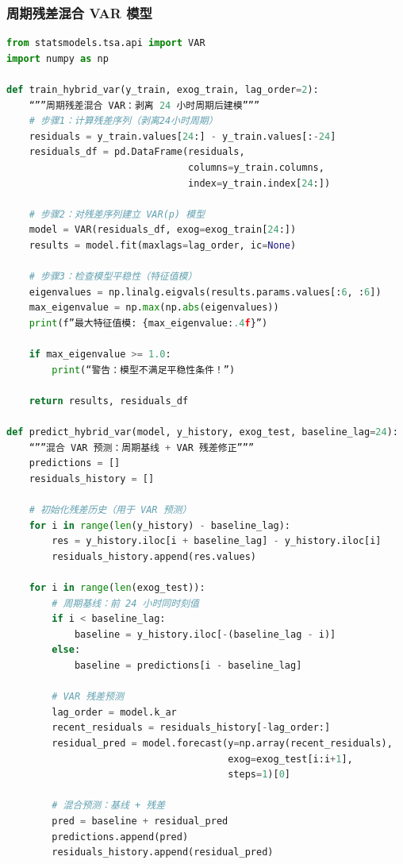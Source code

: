 \documentclass[UTF8,a4paper,12pt]{ctexart}
\begin{document}
\subsubsection{周期残差混合 VAR 模型}

\begin{lstlisting}[language=Python]
from statsmodels.tsa.api import VAR
import numpy as np

def train_hybrid_var(y_train, exog_train, lag_order=2):
    “””周期残差混合 VAR：剥离 24 小时周期后建模”””
    # 步骤1：计算残差序列（剥离24小时周期）
    residuals = y_train.values[24:] - y_train.values[:-24]
    residuals_df = pd.DataFrame(residuals,
                                columns=y_train.columns,
                                index=y_train.index[24:])

    # 步骤2：对残差序列建立 VAR(p) 模型
    model = VAR(residuals_df, exog=exog_train[24:])
    results = model.fit(maxlags=lag_order, ic=None)

    # 步骤3：检查模型平稳性（特征值模）
    eigenvalues = np.linalg.eigvals(results.params.values[:6, :6])
    max_eigenvalue = np.max(np.abs(eigenvalues))
    print(f”最大特征值模: {max_eigenvalue:.4f}”)

    if max_eigenvalue >= 1.0:
        print(“警告：模型不满足平稳性条件！”)

    return results, residuals_df

def predict_hybrid_var(model, y_history, exog_test, baseline_lag=24):
    “””混合 VAR 预测：周期基线 + VAR 残差修正”””
    predictions = []
    residuals_history = []

    # 初始化残差历史（用于 VAR 预测）
    for i in range(len(y_history) - baseline_lag):
        res = y_history.iloc[i + baseline_lag] - y_history.iloc[i]
        residuals_history.append(res.values)

    for i in range(len(exog_test)):
        # 周期基线：前 24 小时同时刻值
        if i < baseline_lag:
            baseline = y_history.iloc[-(baseline_lag - i)]
        else:
            baseline = predictions[i - baseline_lag]

        # VAR 残差预测
        lag_order = model.k_ar
        recent_residuals = residuals_history[-lag_order:]
        residual_pred = model.forecast(y=np.array(recent_residuals),
                                       exog=exog_test[i:i+1],
                                       steps=1)[0]

        # 混合预测：基线 + 残差
        pred = baseline + residual_pred
        predictions.append(pred)
        residuals_history.append(residual_pred)


\end{lstlisting}
\end{document}

